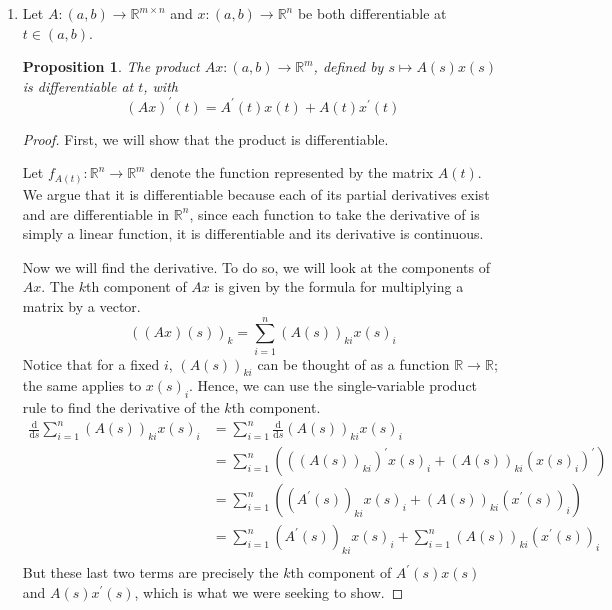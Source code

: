 \documentclass[letterpaper,11pt]{article}
\newtheorem{prop}{Proposition}
\newcommand{\R}{\mathbb{R}}
\renewcommand{\d}[1]{\frac{\text{d}}{\text{d}#1}}
\begin{document}
\begin{enumerate}
    \item Let $A : (a, b) \to \R^{m \times n}$ and $x : (a, b) \to \R^n$ be
        both differentiable at $t \in (a, b)$.

        \begin{prop}
            The product $Ax : (a, b) \to \R^m$, defined by $s \mapsto A(s)x(s)$
            is differentiable at $t$, with
            \begin{equation*}
                (Ax)^\prime (t) = A^\prime (t) x(t) + A(t) x^\prime (t)
            \end{equation*}
        \end{prop}

        \begin{proof}
            First, we will show that the product is differentiable.

            Let $f_{A(t)} : \R^n \to \R^m$ denote the function represented by
            the matrix $A(t)$. We argue that it is differentiable because each
            of its partial derivatives exist and are differentiable in $\R^n$,
            since each function to take the derivative of is simply a linear
            function, it is differentiable and its derivative is continuous.

            Now we will find the derivative. To do so, we will look at the
            components of $Ax$. The $k$th component of $Ax$ is given by the
            formula for multiplying a matrix by a vector.
            \begin{equation*}
                ((Ax)(s))_k = \sum_{i=1}^n (A(s))_{ki} x(s)_i
            \end{equation*}
            Notice that for a fixed $i$, $(A(s))_{ki}$ can be thought of as a
            function $\R \to \R$; the same applies to $x(s)_i$. Hence, we can
            use the single-variable product rule to find the derivative of the
            $k$th component.
            \begin{align*}
                \d{s} \sum_{i=1}^n (A(s))_{ki} x(s)_i
                &= \sum_{i=1}^n { \d{s} (A(s))_{ki} x(s)_i } \\
                &= \sum_{i=1}^n \left(
                    ((A(s))_{ki})^\prime x(s)_i + (A(s))_{ki} (x(s)_i)^\prime
                \right)\\
                &= \sum_{i=1}^n \left(
                    (A^\prime (s))_{ki} x(s)_i + (A(s))_{ki} (x^\prime (s))_i
                \right)\\
                &= \sum_{i=1}^n (A^\prime (s))_{ki} x(s)_i
                + \sum_{i=1}^n (A(s))_{ki} (x^\prime (s))_i \\
            \end{align*}
            But these last two terms are precisely the $k$th component of
            $A^\prime (s) x(s)$ and $A(s) x^\prime (s)$, which is what we were
            seeking to show.
        \end{proof}


\end{enumerate}
\end{document}
